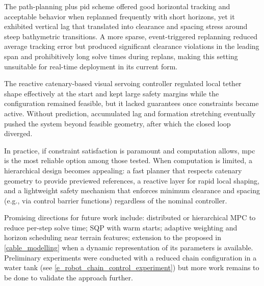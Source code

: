 The path-planning plus \ac{pid} scheme offered good horizontal tracking and acceptable behavior
when replanned frequently with short horizons, yet it exhibited vertical lag that translated into
clearance and spacing stress around steep bathymetric transitions. A more sparse, event-triggered
replanning reduced average tracking error but produced significant clearance violations in the
leading span and prohibitively long solve times during replans, making this setting unsuitable for
real-time deployment in its current form.

The reactive catenary-based visual servoing controller regulated local tether shape effectively at
the start and kept large safety margins while the configuration remained feasible, but it lacked
guarantees once constraints became active. Without prediction, accumulated lag and formation
stretching eventually pushed the system beyond feasible geometry, after which the closed loop
diverged.

In practice, if constraint satisfaction is paramount and computation allows, \ac{mpc} is the most
reliable option among those tested. When computation is limited, a hierarchical design becomes
appealing: a fast planner that respects catenary geometry to provide previewed references, a
reactive layer for rapid local shaping, and a lightweight safety mechanism that enforces minimum
clearance and spacing (e.g., via control barrier functions) regardless of the nominal controller.

Promising directions for future work include: distributed or hierarchical MPC to reduce per-step
solve time; SQP with warm starts; adaptive weighting and horizon scheduling near terrain features;
extension to the \augmentedmodel{} proposed in \cref{cable_modelling} when a dynamic representation
of its parameters is available. Preliminary experiments were conducted with a reduced chain
configuration in a water tank (see \cref{e_robot_chain_control_experiment}) but more work remains
to be done to validate the approach further.
